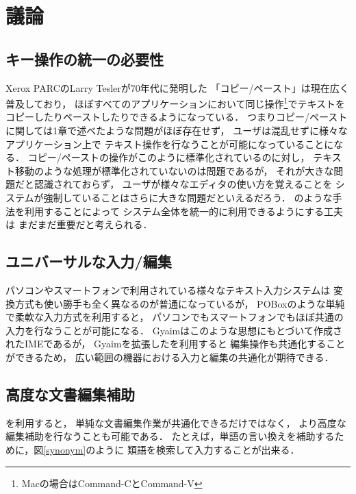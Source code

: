 \section{議論}

\subsection{キー操作の統一の必要性}

Xerox PARCのLarry Teslerが70年代に発明した\cite{Tesler:CopyPaste}
「コピー/ペースト」は現在広く普及しており，
ほぼすべてのアプリケーションにおいて同じ操作\footnote{
  Macの場合はCommand-CとCommand-V
}でテキストをコピーしたりペーストしたりできるようになっている．
つまりコピー/ペーストに関しては1章で述べたような問題がほぼ存在せず，
ユーザは混乱せずに様々なアプリケーション上で
テキスト操作を行なうことが可能になっていることになる．
コピー/ペーストの操作がこのように標準化されているのに対し，
テキスト移動のような処理が標準化されていないのは問題であるが，
それが大きな問題だと認識されておらず，
ユーザが様々なエディタの使い方を覚えることを
システムが強制していることはさらに大きな問題だといえるだろう．
{\system}のような手法を利用することによって
システム全体を統一的に利用できるようにする工夫は
まだまだ重要だと考えられる．

\subsection{ユニバーサルな入力/編集}

パソコンやスマートフォンで利用されている様々なテキスト入力システムは
変換方式も使い勝手も全く異なるのが普通になっているが，
POBox\cite{Masui:POBox}のような単純で柔軟な入力方式を利用すると，
パソコンでもスマートフォンでもほぼ共通の入力を行なうことが可能になる．
Gyaimはこのような思想にもとづいて作成されたIMEであるが，
Gyaimを拡張した{\system}を利用すると
編集操作も共通化することができるため，
広い範囲の機器における入力と編集の共通化が期待できる．

\subsection{高度な文書編集補助}

{\system}を利用すると，
単純な文書編集作業が共通化できるだけではなく，
より高度な編集補助を行なうことも可能である．
たとえば，単語の言い換えを補助するために，図\ref{synonym}のように
類語を検索して入力することが出来る．

